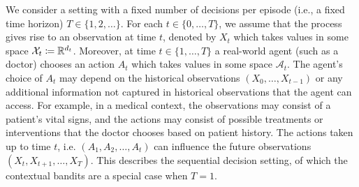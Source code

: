 We consider a setting with a fixed number of decisions per episode (i.e., a fixed time horizon) $T \in \{1, 2, \ldots\}$. For each $t\in \{0, \ldots, T\}$, we assume that the process gives rise to an observation at time $t$, denoted by $X_t$ which takes values in some space $\mathcal{X}_t \coloneqq \mathbb{R}^{d_t}$. 
Moreover, at time $t\in  \{1, \ldots, T\}$ a real-world agent (such as a doctor) chooses an action $A_t$ which takes values in some space $\mathcal{A}_t$. The agent's choice of $A_t$ may depend on the historical observations $(X_0, \ldots, X_{t-1})$ or any additional information not captured in historical observations that the agent can access. For example, in a medical context, the observations may consist of a patient's vital signs, and the actions may consist of possible treatments or interventions that the doctor chooses based on patient history.
The actions taken up to time $t$, i.e. $(A_1, A_2, \ldots, A_t)$ can influence the future observations $(X_t, X_{t+1}, \ldots, X_T)$. 
This describes the sequential decision setting, of which the contextual bandits are a special case when $T=1$. 

